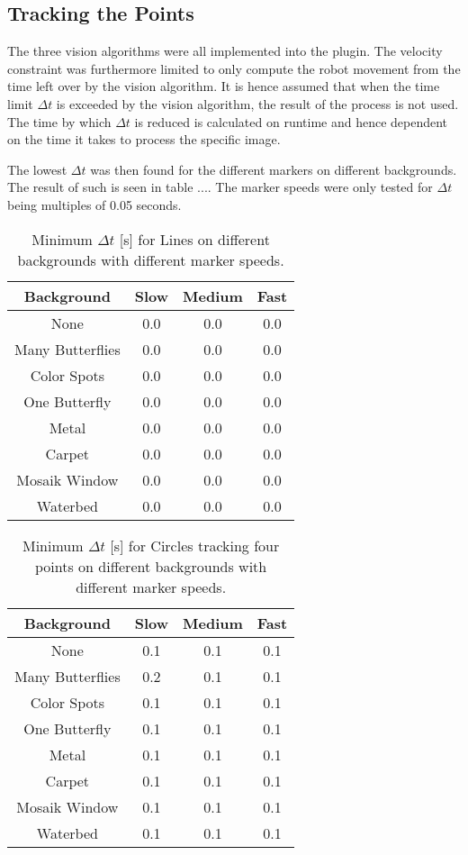 \subsection{Tracking the Points}
The three vision algorithms were all implemented into the plugin.
The velocity constraint was furthermore limited to only compute the robot movement from the time left over by the vision algorithm.
It is hence assumed that when the time limit $\Delta t$ is exceeded by the vision algorithm, the result of the process is not used.
The time by which $\Delta t$ is reduced is calculated on runtime and hence dependent on the time it takes to process the specific image.

The lowest $\Delta t$ was then found for the different markers on different backgrounds.
The result of such is seen in table ....
The marker speeds were only tested for $\Delta t$ being multiples of 0.05 seconds.


\begin{table}[H]
\center
\begin{tabular}{|c|c|c|c|}
\hline
Background & Slow & Medium & Fast \\ \hline
None & 0.0 & 0.0 & 0.0 \\ \hline
Many Butterflies & 0.0 & 0.0 & 0.0 \\ \hline
Color Spots & 0.0 & 0.0 & 0.0 \\ \hline
One Butterfly & 0.0 & 0.0 & 0.0 \\ \hline
Metal & 0.0 & 0.0 & 0.0 \\ \hline
Carpet & 0.0 & 0.0 & 0.0 \\ \hline
Mosaik Window & 0.0 & 0.0 & 0.0 \\ \hline
Waterbed & 0.0 & 0.0 & 0.0 \\ \hline
\end{tabular}
\caption{Minimum $\Delta t$ [s] for Lines on different backgrounds with different marker speeds.}
\end{table}

\begin{table}[H]
\center
\begin{tabular}{|c|c|c|c|}
\hline
Background & Slow & Medium & Fast \\ \hline
None & 0.1 & 0.1 & 0.1 \\ \hline
Many Butterflies & 0.2 & 0.1 & 0.1 \\ \hline
Color Spots & 0.1 & 0.1 & 0.1 \\ \hline
One Butterfly & 0.1 & 0.1 & 0.1 \\ \hline
Metal & 0.1 & 0.1 & 0.1 \\ \hline
Carpet & 0.1 & 0.1 & 0.1 \\ \hline
Mosaik Window & 0.1 & 0.1 & 0.1 \\ \hline
Waterbed & 0.1 & 0.1 & 0.1 \\ \hline
\end{tabular}
\caption{Minimum $\Delta t$ [s] for Circles tracking four points on different backgrounds with different marker speeds.}
\end{table}

